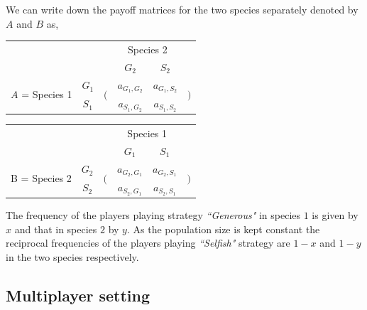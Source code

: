 \documentclass[a4paper]{scrartcl}
\begin{document}
We can write down the payoff matrices for the two species separately  denoted by $A$ and $B$ as,
\begin{tabular}{cccccc}
& & & \multicolumn{2}{c}{Species 2} &\\
& & & $G_2$ & $S_2$ &\\
\multirow{2}{*}{$A$ = Species 1}& $G_1$
& \multirow{2}{*}{$\bigg($} & $a_{G_1,G_2}$ & $a_{G_1,S_2}$ & \multirow{2}{*}{$\bigg)$}\\
& $S_1$ & & $a_{S_1,G_2}$ & $a_{S_1,S_2}$ &
\end{tabular}
\begin{tabular}{cccccc}
& & & \multicolumn{2}{c}{Species 1} &\\
& & & $G_1$ & $S_1$ &\\
\multirow{2}{*}{B = Species 2}& $G_2$
& \multirow{2}{*}{$\bigg($} & $a_{G_2,G_1}$ & $a_{G_2,S_1}$ & \multirow{2}{*}{$\bigg)$}\\
& $S_2$ & & $a_{S_2,G_1}$ & $a_{S_2,S_1}$ &\ \ .
\end{tabular}
The frequency of the players playing strategy \textit{``Generous"} in species $1$ is given by $x$ and that in species $2$ by $y$.
As the population size is kept constant the reciprocal frequencies of the players playing \textit{``Selfish"} strategy are $1-x$ and $1-y$ in the two species respectively.

\subsection*{Multiplayer setting}
\label{appB}
\end{document}
